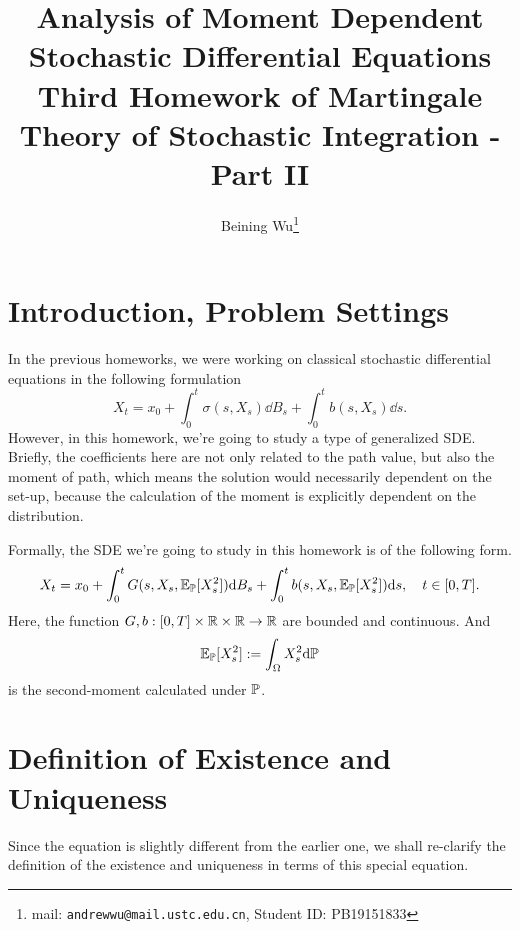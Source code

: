 \documentclass[8pt,onesided]{article}
\begin{document}
    
{
\title{\mc  Analysis of Moment Dependent Stochastic Differential Equations\vspace*{.5em}\\  \large Third Homework of Martingale Theory of Stochastic Integration - Part II}
\author{Beining Wu\footnote{mail: \texttt{andrewwu@mail.ustc.edu.cn}, Student ID: PB19151833}}
\maketitle
}

\section{Introduction, Problem Settings}

In the previous homeworks, we were working on classical stochastic differential equations in the following formulation
\begin{equation*}
    X_t=x_0+\int_0^t \sigma(s,X_s) \dd B_s+\int_0^t b(s,X_s) \dd s.
\end{equation*}
However, in this homework, we're going to study a type of generalized SDE. Briefly, the coefficients here are not only related to the path value, but also the moment of path, which means the solution would necessarily dependent on the set-up, because the calculation of the moment is explicitly dependent on the distribution.

Formally, the SDE we're going to study in this homework is of the following form.
\begin{equation}
    \label{msde}
    X_t=x_0+\int_0^t G(s,X_s,\mathbb{E}_{\mathbb{P}}[X_s^2]) \dd B_s+\int_0^t b(s,X_s,\mathbb{E}_{\mathbb{P}}[X_s^2]) \dd s,\quad t\in[0,T].
\end{equation}
Here, the function $G, b: [0,T]\times \mathbb{R} \times \mathbb{R}\to \mathbb{R}$ are bounded and continuous. And
\begin{equation*}
    \mathbb{E}_{\mathbb{P}} [X_s^2]:=\int_\Omega X_s^2 \dd \mathbb{P}
\end{equation*}
is the second-moment calculated under $\mathbb{P}$.




\section{Definition of Existence and Uniqueness}

Since the equation is slightly different from the earlier one, we shall re-clarify the definition of the existence and uniqueness in terms of this special equation. 
\end{document}
